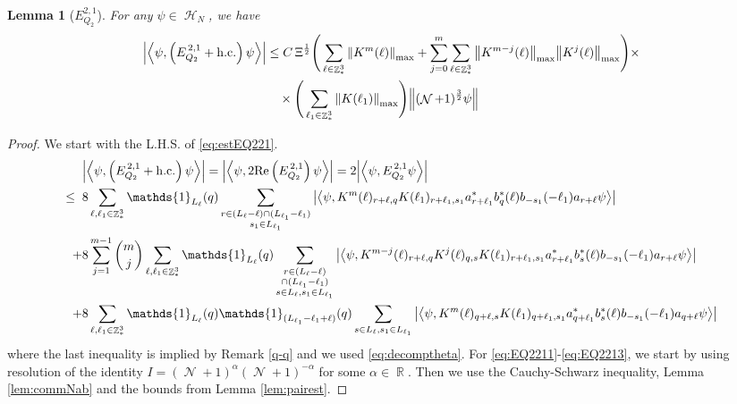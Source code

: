 \documentclass[sn-mathphys, Numbered ,a4paper]{sn-jnl}%
\DeclareMathOperator{\R}{\mathbb{R}}
\DeclareMathOperator{\Z}{\mathbb{Z}}
\DeclareMathOperator{\HH}{\mathcal{H}}
\DeclareMathOperator{\NN}{\mathcal{N}}
\newcommand{\half}{\frac{1}{2}}
\newcommand{\eva}[1]{\left\langle #1 \right\rangle}
\theoremstyle{plain}
\newtheorem{lemma}[theorem]{Lemma}
\theoremstyle{definition}
\theoremstyle{remark}
\theoremstyle{plain}
\theoremstyle{definition}
\theoremstyle{remark}
\begin{document}
\begin{lemma}[$E_{Q_2}^{2,1}$]
    For any $\psi \in \HH_N$, we have
    \begin{align}
    	\abs{\eva{\psi,\left(E^{\,2,1}_{Q_2}+\mathrm{h.c.}\right) \psi }}
    	&\leq  C\, \Xi^{\half} \Bigg(\sum\limits_{\ell \in \Z^3_*} \norm{K^m(\ell)}_{\mathrm{max}} + \sum\limits_{j=0}^m \sum\limits_{\ell \in \Z^3_*}\norm{K^{m-j}(\ell)}_{\mathrm{max}}\norm{K^{j}(\ell)}_{\mathrm{max}}\Bigg)\times\nonumber\\&\quad\times \Bigg( \sum\limits_{\ell_1 \in \Z^3_*}\norm{K(\ell_1)}_{\mathrm{max}} \Bigg)  \norm { (\NN+1)^{\frac{3}{2}} \psi }  \label{eq:estEQ221}
    \end{align}
\end{lemma}
\begin{proof}
 We start with the L.H.S. of \eqref{eq:estEQ221}.
 \begin{align}
 	&\abs{\eva{\psi,\left(E^{\,2,1}_{Q_2}+\mathrm{h.c.}\right) \psi }} = \abs{\eva{\psi,2\mathrm{Re}\left(E^{\,2,1}_{Q_2}\right) \psi }} = 2\abs{\eva{\psi, E^{\,2,1}_{Q_2} \psi }}\nonumber\\
 	\leq\;\;&8 \sum\limits_{\ell, \ell_1\in \Z^3_*} \mathds{1}_{L_{\ell}}(q) \sum\limits_{\substack{r\in (L_{\ell}-\ell) \cap (L_{\ell_1}-\ell_1)\\ s_1\in L_{\ell_1} }} \abs{\eva{\psi,  K^m(\ell )_{r+\ell,q}K(\ell_1)_{r+\ell_1,s_1}
 			a^*_{r+\ell_1} b^*_{q}(\ell) b_{-s_1}(-\ell_1)a_{r+\ell} \psi}} \label{eq:EQ2211}\\
 	\;+&8 \sum\limits_{j=1}^{m-1} {{m}\choose j} \sum\limits_{\ell, \ell_1\in \Z^3_*}\mathds{1}_{L_{\ell}}(q) \sum\limits_{\substack{r\in (L_{\ell}-\ell) \\ \cap (L_{\ell_1}-\ell_1)\\ s \in L_{\ell},s_1\in L_{\ell_1} }}  \abs{\eva{\psi,  K^{m-j}(\ell)_{r+\ell,q} K^{j}(\ell)_{q,s} K(\ell_1)_{r+\ell_1,s_1} a^*_{r+\ell_1} b^*_{s}(\ell) b_{-s_1}(-\ell_1) a_{r+\ell} \psi }} \label{eq:EQ2212}\\
 	\;+&8\sum\limits_{\ell, \ell_1\in \Z^3_*} \mathds{1}_{L_{\ell}}(q) \mathds{1}_{(L_{\ell_1}-\ell_1+\ell)}(q) \sum\limits_{s \in L_{\ell},s_1\in L_{\ell_1}} \abs{\eva{\psi,  K^m(\ell)_{q+\ell,s} K(\ell_1)_{q+\ell_1,s_1} a^*_{q+\ell_1} b^*_{s}(\ell) b_{-s_1}(-\ell_1) a_{q+\ell} \psi}} \label{eq:EQ2213}
 \end{align}
 where the last inequality is implied by Remark \ref{q-q} and we used \eqref{eq:decomptheta}.
 For \eqref{eq:EQ2211}-\eqref{eq:EQ2213}, we start by using resolution of the identity $I = (\NN+1)^{\alpha}(\NN+1)^{-\alpha}$ for some $\alpha \in \R$. Then we use the Cauchy-Schwarz inequality, Lemma \ref{lem:commNab} and the bounds from Lemma \ref{lem:pairest}.

\end{proof}
\end{document}
